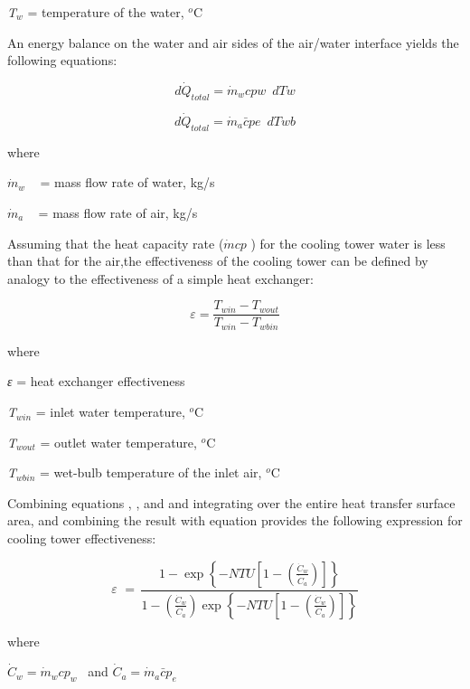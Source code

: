 \emph{T\(_{w}\)} = temperature of the water, \(^{o}\)C

An energy balance on the water and air sides of the air/water interface yields the following equations:

\begin{equation}
d{\dot Q_{total}} = {\dot m_w}cpw\,\,\,dTw
\end{equation}

\begin{equation}
d{\dot Q_{total}} = {\dot m_a}\bar cpe\,\,\,dTwb
\end{equation}

where

\({\dot m_w}\) ~ = mass flow rate of water, kg/s

\({\dot m_a}\) ~ = mass flow rate of air, kg/s

Assuming that the heat capacity rate (\(\dot mcp\) ) for the cooling tower water is less than that for the air,the effectiveness of the cooling tower can be defined by analogy to the effectiveness of a simple heat exchanger:

\begin{equation}
\varepsilon  = \frac{{{T_{win}} - {T_{wout}}}}{{{T_{win}} - {T_{wbin}}}}
\end{equation}

where

\emph{ε} = heat exchanger effectiveness

\emph{T\(_{win}\)} = inlet water temperature, \(^{o}\)C

\emph{T\(_{wout}\)} = outlet water temperature, \(^{o}\)C

\emph{T\(_{wbin}\)} = wet-bulb temperature of the inlet air, \(^{o}\)C

Combining equations , , and and integrating over the entire heat transfer surface area, and combining the result with equation provides the following expression for cooling tower effectiveness:

\begin{equation}
\varepsilon \,\, = \,\frac{{1 - \exp \left\{ { - NTU\left[ {1 - \left( {\frac{{{{\dot C}_w}}}{{{{\dot C}_a}}}} \right)} \right]} \right\}}}{{1 - \left( {\frac{{{{\dot C}_w}}}{{{{\dot C}_a}}}} \right)\exp \left\{ { - NTU\left[ {1 - \left( {\frac{{{{\dot C}_w}}}{{{{\dot C}_a}}}} \right)} \right]} \right\}}}
\end{equation}

where

\({\dot C_w} = {\dot m_w}c{p_w}\) ~and \({\dot C_a} = {\dot m_a}\bar c{p_e}\)

